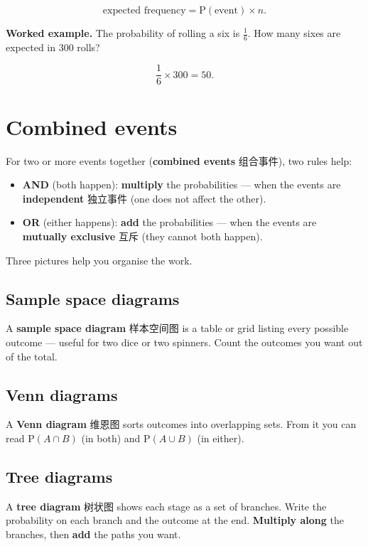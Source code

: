 \documentclass[11pt]{article}
\begin{document}
\[
\text{expected frequency} = \text{P}(\text{event}) \times n.
\]

\textbf{Worked example.} The probability of rolling a six is $\tfrac{1}{6}$. How many sixes are expected in $300$ rolls?

\[
\frac{1}{6} \times 300 = 50.
\]

\section*{Combined events}

For two or more events together (\textbf{combined events} 组合事件), two rules help:

\begin{itemize}
\item \textbf{AND} (both happen): \textbf{multiply} the probabilities — when the events are \textbf{independent} 独立事件 (one does not affect the other).

\item \textbf{OR} (either happens): \textbf{add} the probabilities — when the events are \textbf{mutually exclusive} 互斥 (they cannot both happen).

\end{itemize}

Three pictures help you organise the work.

\subsection*{Sample space diagrams}

A \textbf{sample space diagram} 样本空间图 is a table or grid listing every possible outcome — useful for two dice or two spinners. Count the outcomes you want out of the total.

\subsection*{Venn diagrams}

A \textbf{Venn diagram} 维恩图 sorts outcomes into overlapping sets. From it you can read $\text{P}(A \cap B)$ (in both) and $\text{P}(A \cup B)$ (in either).

\subsection*{Tree diagrams}

A \textbf{tree diagram} 树状图 shows each stage as a set of branches. Write the probability on each branch and the outcome at the end. \textbf{Multiply along} the branches, then \textbf{add} the paths you want.
\end{document}
